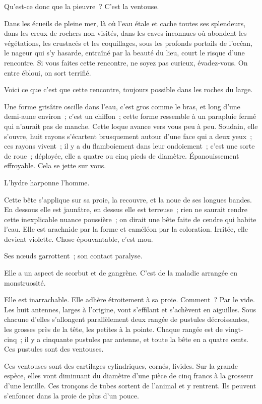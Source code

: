 \documentclass[french,twoside]{book} %
\begin{document}
Qu’est-ce donc que la pieuvre ? C’est la ventouse.\par
Dans les écueils de pleine mer, là où l’eau étale et cache toutes ses splendeurs, dans les creux de rochers non visités, dans les caves inconnues où abondent les végétations, les crustacés et les coquillages, sous les profonds portails de l’océan, le nageur qui s’y hasarde,  entraîné par la beauté du lieu, court le risque d’une rencontre. Si vous faites cette rencontre, ne soyez pas curieux, évadez-vous. On entre ébloui, on sort terrifié.\par
Voici ce que c’est que cette rencontre, toujours possible dans les roches du large.\par
Une forme grisâtre oscille dans l’eau, c’est gros comme le bras, et long d’une demi-aune environ ; c’est un chiffon ; cette forme ressemble à un parapluie fermé qui n’aurait pas de manche. Cette loque avance vers vous peu à peu. Soudain, elle s’ouvre, huit rayons s’écartent brusquement autour d’une face qui a deux yeux ; ces rayons vivent ; il y a du flamboiement dans leur ondoiement ; c’est une sorte de roue ; déployée, elle a quatre ou cinq pieds de diamètre. Épanouissement effroyable. Cela se jette sur vous.\par
L’hydre harponne l’homme.\par
Cette bête s’applique sur sa proie, la recouvre, et la noue de ses longues bandes. En dessous elle est jaunâtre, en dessus elle est terreuse ; rien ne saurait rendre cette inexplicable nuance poussière ; on dirait une bête faite de cendre qui habite l’eau. Elle est arachnide par la forme et caméléon par la coloration. Irritée, elle devient violette. Chose épouvantable, c’est mou.\par
Ses nœuds garrottent ; son contact paralyse.\par
Elle a un aspect de scorbut et de gangrène. C’est de la maladie arrangée en monstruosité.\par
Elle est inarrachable. Elle adhère étroitement à sa proie. Comment ? Par le vide. Les huit antennes, larges à l’origine, vont s’effilant et s’achèvent en aiguilles.  Sous chacune d’elles s’allongent parallèlement deux rangée de pustules décroissantes, les grosses près de la tête, les petites à la pointe. Chaque rangée est de vingt-cinq ; il y a cinquante pustules par antenne, et toute la bête en a quatre cents. Ces pustules sont des ventouses.\par
Ces ventouses sont des cartilages cylindriques, cornés, livides. Sur la grande espèce, elles vont diminuant du diamètre d’une pièce de cinq francs à la grosseur d’une lentille. Ces tronçons de tubes sortent de l’animal et y rentrent. Ils peuvent s’enfoncer dans la proie de plus d’un pouce.\par
\end{document}
